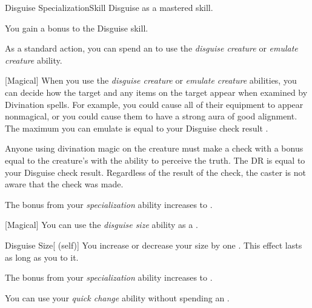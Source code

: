     \begin{feat}{Disguise Specialization}{Skill}
        \featpre Disguise as a mastered skill.

         You gain a  bonus to the Disguise skill.

         As a standard action, you can spend an  to use the \textit{disguise creature} or \textit{emulate creature} ability.

        [Magical] When you use the \textit{disguise creature} or \textit{emulate creature} abilities, you can decide how the target and any items on the target appear when examined by Divination spells.
        For example, you could cause all of their equipment to appear nonmagical, or you could cause them to have a strong aura of good alignment.
        The maximum  you can emulate is equal to your Disguise check result .

        Anyone using divination magic on the creature must make a check with a bonus equal to the creature's  with the ability to perceive the truth.
        The DR is equal to your Disguise check result.
        Regardless of the result of the check, the caster is not aware that the check was made.

         The bonus from your \textit{specialization} ability increases to .

        [Magical] You can use the \textit{disguise size} ability as a .
        \begin{attuneability}{Disguise Size}[ (self)]
            You increase or decrease your size by one .
            This effect lasts as long as you  to it.
        \end{attuneability}

         The bonus from your \textit{specialization} ability increases to .

         You can use your \textit{quick change} ability without spending an .
    \end{feat}

